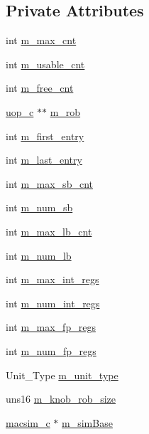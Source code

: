 \subsection*{Private Attributes}
\begin{DoxyCompactItemize}
\item 
int \hyperlink{classrob__c_ab233034fffb30c0bbffc402e74cbd3b3}{m\_\-max\_\-cnt}
\item 
int \hyperlink{classrob__c_a01a33ab695e5fdcec8c271d7f7a9758b}{m\_\-usable\_\-cnt}
\item 
int \hyperlink{classrob__c_a80da438135b0e6e3d0c81e105fe34e8e}{m\_\-free\_\-cnt}
\item 
\hyperlink{classuop__c}{uop\_\-c} $\ast$$\ast$ \hyperlink{classrob__c_a91eb948dd7fad415fa924e077e2e507a}{m\_\-rob}
\item 
int \hyperlink{classrob__c_a941fb62da6f46460bec3f738fda59aab}{m\_\-first\_\-entry}
\item 
int \hyperlink{classrob__c_a7420d155265448b2d0fcbbcae5293c05}{m\_\-last\_\-entry}
\item 
int \hyperlink{classrob__c_a7026c11d9809e91c2d9455015e8818b4}{m\_\-max\_\-sb\_\-cnt}
\item 
int \hyperlink{classrob__c_acef1013b52096eaf28dff1108533590a}{m\_\-num\_\-sb}
\item 
int \hyperlink{classrob__c_aed06018aced1ac1285e9b6e07a7ec25e}{m\_\-max\_\-lb\_\-cnt}
\item 
int \hyperlink{classrob__c_af164e55237aee6fd38c06baf8e4079c5}{m\_\-num\_\-lb}
\item 
int \hyperlink{classrob__c_ae9c171e9959ffc16154f278555ba72df}{m\_\-max\_\-int\_\-regs}
\item 
int \hyperlink{classrob__c_a5ca3ef95e9d8ba4bc517c6ecbb3a628a}{m\_\-num\_\-int\_\-regs}
\item 
int \hyperlink{classrob__c_a99349607046f231290135c44f6e466af}{m\_\-max\_\-fp\_\-regs}
\item 
int \hyperlink{classrob__c_a0fd2dd4e3783114c2d2d5fad5c40d480}{m\_\-num\_\-fp\_\-regs}
\item 
Unit\_\-Type \hyperlink{classrob__c_ac7c7d51958a975d0c6e19abab9c758ed}{m\_\-unit\_\-type}
\item 
uns16 \hyperlink{classrob__c_a9fac795612c146812ae2e8f3a5904e25}{m\_\-knob\_\-rob\_\-size}
\item 
\hyperlink{classmacsim__c}{macsim\_\-c} $\ast$ \hyperlink{classrob__c_add617f927c196857b7bdd71e2cf11e75}{m\_\-simBase}
\end{DoxyCompactItemize}


